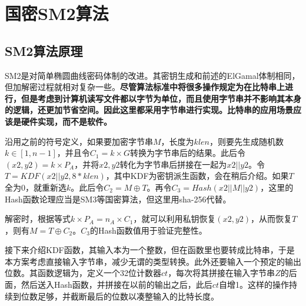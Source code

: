 \documentclass[11pt]{ctexart}
\begin{document}
\section{国密SM2算法} %
\subsection{SM2算法原理} %
SM2是对简单椭圆曲线密码体制的改进。其密钥生成和前述的ElGamal体制相同，但加解密过程就相对复杂一些。\textbf{尽管算法标准中将很多操作规定为在比特串上进行，但是考虑到计算机读写文件都以字节为单位，而且使用字节串并不影响其本身的逻辑，还更加节省空间。因此这里都采用字节串进行实现。比特串的应用场景应该是硬件实现，而不是软件。}

沿用之前的符号定义，如果要加密字节串$M$，长度为$klen$，则要先生成随机数$k \in [1, n - 1]$，并且令$C_1 = k \times G$转换为字节串后的结果。此后令$(x2, y2) = k \times P_A$，并将$x2, y2$转化为字节串后拼接在一起为$x2||y2$。令$T = KDF(x2||y2, 8 * klen)$，其中KDF为密钥派生函数，会在稍后介绍。如果$T$全为0，就重新选$k$。此后令$C_2 = M \oplus T$。再令$C_3 = Hash(x2 || M || y2)$，这里的Hash函数论理应当是SM3等国密算法，但这里用sha-256代替。

解密时，根据等式$k \times P_A = n_A \times C_1$，就可以利用私钥恢复$(x2, y2)$，从而恢复$T$，则有$M = T \oplus C_2$。$C_3$的Hash函数值用于验证完整性。

接下来介绍KDF函数，其输入本为一个整数，但在函数里也要转成比特串，于是本方案考虑直接输入字节串，减少无谓的类型转换。此外还要输入一个预定的输出位数。其函数逻辑为，定义一个32位计数器$ct$，每次将其拼接在输入字节串$Z$的后面，然后送入Hash函数，并拼接在以前的输出之后，此后$ct$自增1。这样的操作持续到位数足够，并截断最后的位数以凑整输入的比特长度。
\end{document}
